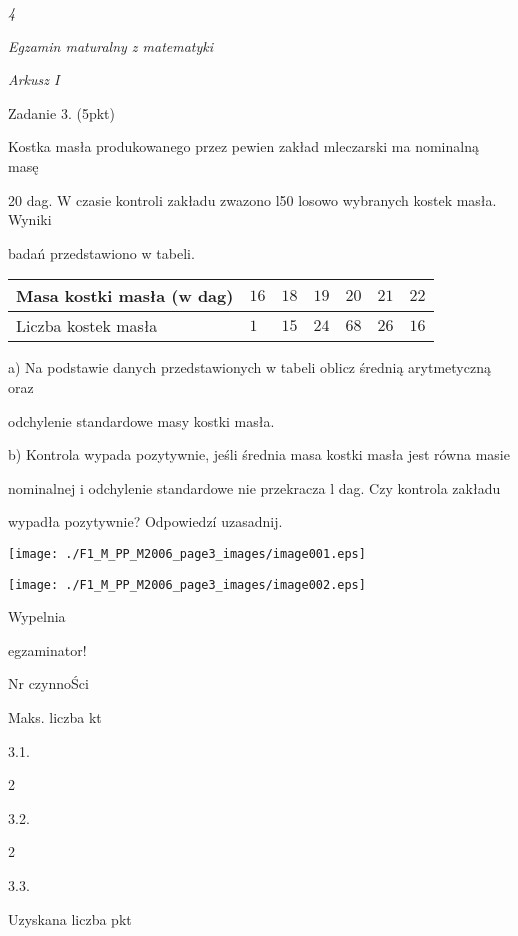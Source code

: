 \documentclass[a4paper,12pt]{article}
\begin{document}
{\it 4}

{\it Egzamin maturalny z matematyki}

{\it Arkusz I}

Zadanie 3. (5pkt)

Kostka masła produkowanego przez pewien zakład mleczarski ma nominalną masę

20 dag. W czasie kontroli zakładu zwazono l50 losowo wybranych kostek masła. Wyniki

badań przedstawiono w tabeli.
\begin{center}
\begin{tabular}{|l|l|l|l|l|l|l|}
\hline
\multicolumn{1}{|l|}{Masa kostki masła (w dag)}&	\multicolumn{1}{|l|}{$16$}&	\multicolumn{1}{|l|}{ $18$}&	\multicolumn{1}{|l|}{ $19$}&	\multicolumn{1}{|l|}{ $20$}&	\multicolumn{1}{|l|}{ $21$}&	\multicolumn{1}{|l|}{ $22$}	\\
\hline
\multicolumn{1}{|l|}{Liczba kostek masła}&	\multicolumn{1}{|l|}{$1$}&	\multicolumn{1}{|l|}{ $15$}&	\multicolumn{1}{|l|}{ $24$}&	\multicolumn{1}{|l|}{ $68$}&	\multicolumn{1}{|l|}{ $26$}&	\multicolumn{1}{|l|}{ $16$}	\\
\hline
\end{tabular}

\end{center}
a) Na podstawie danych przedstawionych w tabeli oblicz średnią arytmetyczną oraz

odchylenie standardowe masy kostki masła.

b) Kontrola wypada pozytywnie, jeśli średnia masa kostki masła jest równa masie

nominalnej i odchylenie standardowe nie przekracza l dag. Czy kontrola zakładu

wypadła pozytywnie? Odpowiedzí uzasadnij.
\begin{center}
\texttt{[image: ./F1\_M\_PP\_M2006\_page3\_images/image001.eps]}

\texttt{[image: ./F1\_M\_PP\_M2006\_page3\_images/image002.eps]}
\end{center}
Wypelnia

egzaminator!

Nr czynnoŚci

Maks. liczba kt

3.1.

2

3.2.

2

3.3.

Uzyskana liczba pkt
\end{document}
